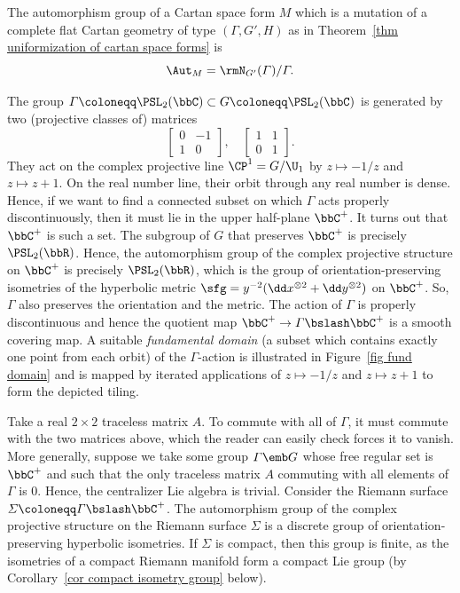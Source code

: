 \begin{cor}
    The automorphism group of a Cartan space form $M$ which is a mutation of a complete flat Cartan geometry of type $(\varGamma,G',H)$ as in Theorem~\ref{thm uniformization of cartan space forms} is 
    \[\Aut_M=\rmN_{G'}(\varGamma)\slash\varGamma.\]
\end{cor}

\begin{example}
    The group $\varGamma\coloneqq \PSL_{2}(\bbC)\subset G\coloneqq \PSL_2(\bbC)$ is generated by two (projective classes of) matrices 
    \[\begin{bmatrix}
        0 & -1\\
        1 & 0
    \end{bmatrix},\quad \begin{bmatrix}
        1 & 1\\0 & 1
    \end{bmatrix}.\]
    They act on the complex projective line $\CP^1=G\slash \U_1$ by $z\mapsto -1/z$ and $z\mapsto z+1$. On the real number line, their orbit through any real number is dense. Hence, if we want to find a connected subset on which $\varGamma$ acts properly discontinuously, then it must lie in the upper half-plane $\bbC^+$. It turns out that $\bbC^+$ is such a set. The subgroup of $G$ that preserves $\bbC^+$ is precisely $\PSL_2(\bbR)$. Hence, the automorphism group of the complex projective structure on $\bbC^+$ is precisely $\PSL_2(\bbR)$, which is the group of orientation-preserving isometries of the hyperbolic metric $\sfg=y^{-2}(\dd x^{\otimes 2}+\dd y^{\otimes 2})$ on $\bbC^+$. So, $\varGamma$ also preserves the orientation and the metric. The action of $\varGamma$ is properly discontinuous and hence the quotient map $\bbC^+\to \varGamma\bslash\bbC^+$ is a smooth covering map. A suitable \emph{fundamental domain} (a subset which contains exactly one point from each orbit) of the $\varGamma$-action is illustrated in Figure~\ref{fig fund domain} and is mapped by iterated applications of $z\mapsto -1/z$ and $z\mapsto z+1$ to form the depicted tiling.

    Take a real $2\times 2$ traceless matrix $A$. To commute with all of $\varGamma$, it must commute with the two matrices above, which the reader can easily check forces it to vanish. More generally, suppose we take some group $\varGamma\emb G$ whose free regular set is $\bbC^+$ and such that the only traceless matrix $A$ commuting with all elements of $\varGamma$ is $0$. Hence, the centralizer Lie algebra is trivial. Consider the Riemann surface $\varSigma\coloneqq \varGamma\bslash \bbC^+$. The automorphism group of the complex projective structure on the Riemann surface $\varSigma$ is a discrete group of orientation-preserving hyperbolic isometries. If $\varSigma$ is compact, then this group is finite, as the isometries of a compact Riemann manifold form a compact Lie group (by Corollary~\ref{cor compact isometry group} below).
\end{example}

